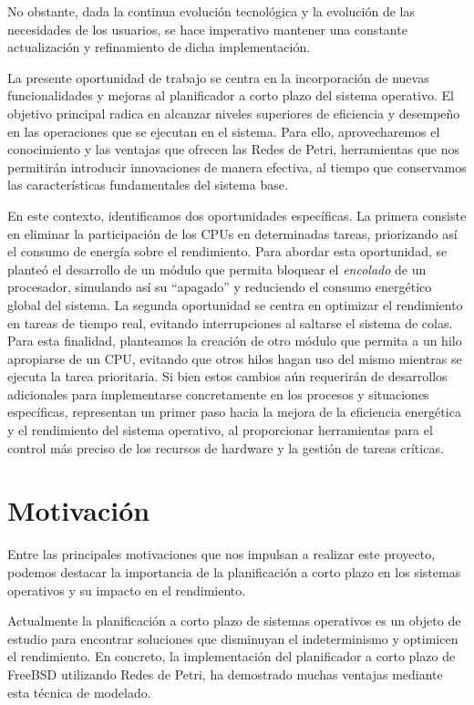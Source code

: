 No obstante, dada la continua evolución tecnológica y la evolución de las necesidades de los usuarios, se hace imperativo mantener una constante actualización y refinamiento de dicha implementación.\par

La presente oportunidad de trabajo se centra en la incorporación de nuevas funcionalidades y mejoras al planificador a corto plazo del sistema operativo. El objetivo principal radica en alcanzar niveles superiores de eficiencia y desempeño en las operaciones que se ejecutan en el sistema. Para ello, aprovecharemos el conocimiento y las ventajas que ofrecen las Redes de Petri, herramientas que nos permitirán introducir innovaciones de manera efectiva, al tiempo que conservamos las características fundamentales del sistema base.\par

En este contexto, identificamos dos oportunidades específicas. La primera consiste en eliminar la participación de los CPUs en determinadas tareas, priorizando así el consumo de energía sobre el rendimiento. Para abordar esta oportunidad, se planteó el desarrollo de un módulo que permita bloquear el \textit{encolado} de un procesador, simulando así su ``apagado'' y reduciendo el consumo energético global del sistema. La segunda oportunidad se centra en optimizar el rendimiento en tareas de tiempo real, evitando interrupciones al saltarse el sistema de colas. Para esta finalidad, planteamos la creación de otro módulo que permita a un hilo apropiarse de un CPU, evitando que otros hilos hagan uso del mismo mientras se ejecuta la tarea prioritaria. Si bien estos cambios aún requerirán de desarrollos adicionales para implementarse concretamente en los procesos y situaciones específicas, representan un primer paso hacia la mejora de la eficiencia energética y el rendimiento del sistema operativo, al proporcionar herramientas para el control más preciso de los recursos de hardware y la gestión de tareas críticas.\par

\section{Motivación}
Entre las principales motivaciones que nos impulsan a realizar este proyecto, podemos destacar la importancia de la planificación a corto plazo en los sistemas operativos y su impacto en el rendimiento.

Actualmente la planificación a corto plazo de sistemas operativos es un objeto de estudio para encontrar soluciones que disminuyan el indeterminismo y optimicen el rendimiento. En concreto, la implementación del planificador a corto plazo de FreeBSD utilizando Redes de Petri, ha demostrado muchas ventajas mediante esta técnica de modelado.\par

